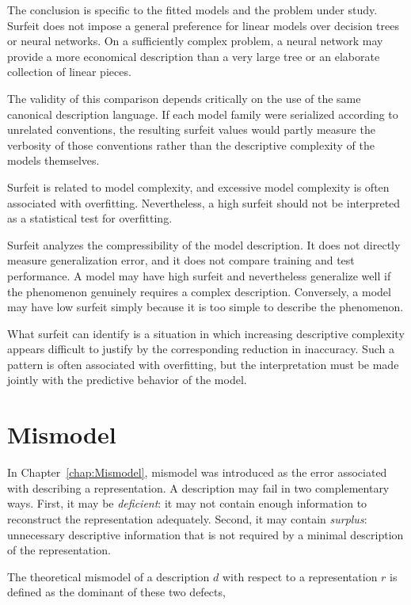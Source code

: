 The conclusion is specific to the fitted models and the problem under study. Surfeit does not impose a general preference for linear models over decision trees or neural networks. On a sufficiently complex problem, a neural network may provide a more economical description than a very large tree or an elaborate collection of linear pieces.

The validity of this comparison depends critically on the use of the same canonical description language. If each model family were serialized according to unrelated conventions, the resulting surfeit values would partly measure the verbosity of those conventions rather than the descriptive complexity of the models themselves.

Surfeit is related to model complexity, and excessive model complexity is often associated with overfitting. Nevertheless, a high surfeit should not be interpreted as a statistical test for overfitting.

Surfeit analyzes the compressibility of the model description. It does not directly measure generalization error, and it does not compare training and test performance. A model may have high surfeit and nevertheless generalize well if the phenomenon genuinely requires a complex description. Conversely, a model may have low surfeit simply because it is too simple to describe the phenomenon.

What surfeit can identify is a situation in which increasing descriptive complexity appears difficult to justify by the corresponding reduction in inaccuracy. Such a pattern is often associated with overfitting, but the interpretation must be made jointly with the predictive behavior of the model.

%
%

\section{Mismodel}
\label{sec:machine_learning_mismodel}

In Chapter~\ref{chap:Mismodel}, mismodel was introduced as the error associated
with describing a representation. A description may fail in two complementary
ways. First, it may be \emph{deficient}: it may not contain enough information
to reconstruct the representation adequately. Second, it may contain
\emph{surplus}: unnecessary descriptive information that is not required by a
minimal description of the representation.

The theoretical mismodel of a description \(d\) with respect to a representation
\(r\) is defined as the dominant of these two defects,

